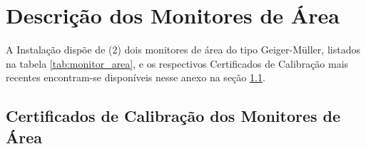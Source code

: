 \chapter{Descrição dos Monitores de Área}
\label{ch:descricao_monitores}

A Instalação dispõe de (2) dois monitores de área do tipo Geiger-Müller, listados na tabela \ref{tab:monitor_area}, e os respectivos Certificados de Calibração mais recentes encontram-se disponíveis nesse anexo na seção \ref{sec:certificados_monitores-area}.

\begin{table}[!h]
    \centering
    \caption{Monitores de área.}
    \label{tab:monitor_area}
\end{table}
\vfill

\pagebreak
\section{Certificados de Calibração dos Monitores de Área}
\label{sec:certificados_monitores-area}


